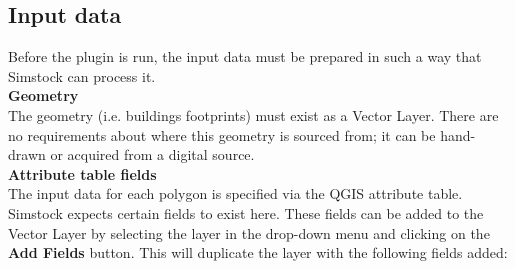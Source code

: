 \documentclass{article}
\begin{document}
\subsection{Input data}
\label{section:inputdata}
Before the plugin is run, the input data must be prepared in such a way that Simstock can process it. \\

\textbf{Geometry} \\
The geometry (i.e. buildings footprints) must exist as a Vector Layer. There are no requirements about where this geometry is sourced from; it can be hand-drawn or acquired from a digital source. \\ %

\textbf{Attribute table fields} \\
The input data for each polygon is specified via the QGIS attribute table. Simstock expects certain fields to exist here. These fields can be added to the Vector Layer by selecting the layer in the drop-down menu and clicking on the \textbf{Add Fields} button. This will duplicate the layer with the following fields added:
\end{document}
